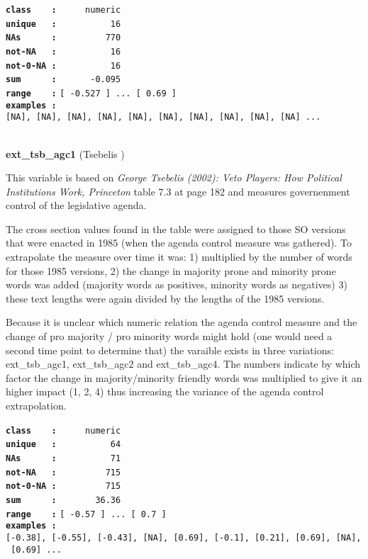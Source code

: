 \documentclass[]{article}
\begin{document}
\textbf{\texttt{class\ \ \ \ :}} \texttt{~~~~~numeric}\\
\textbf{\texttt{unique\ \ \ :}} \texttt{~~~~~~~~~~16}\\
\textbf{\texttt{NAs\ \ \ \ \ \ :}} \texttt{~~~~~~~~~770}\\
\textbf{\texttt{not-NA\ \ \ :}} \texttt{~~~~~~~~~~16}\\
\textbf{\texttt{not-0-NA\ :}} \texttt{~~~~~~~~~~16}\\
\textbf{\texttt{sum\ \ \ \ \ \ :}} \texttt{~~~~~~-0.095}\\
\textbf{\texttt{range\ \ \ \ :}}
\texttt{{[}\ -0.527\ {]}\ ...\ {[}\ 0.69\ {]}}\\
\textbf{\texttt{examples\ :}}
\texttt{{[}NA{]},\ {[}NA{]},\ {[}NA{]},\ {[}NA{]},\ {[}NA{]},\ {[}NA{]},\ {[}NA{]},\ {[}NA{]},\ {[}NA{]},\ {[}NA{]}\ ...}\\

~

\textbf{ext\_tsb\_agc1} (Tsebelis )

This variable is based on \emph{George Tsebelis (2002): Veto Players:
How Political Institutions Work, Princeton} table 7.3 at page 182 and
measures governenment control of the legislative agenda.

The cross section values found in the table were assigned to those SO
versions that were enacted in 1985 (when the agenda control measure was
gathered). To extrapolate the measure over time it was: 1) multiplied by
the number of words for those 1985 versions, 2) the change in majority
prone and minority prone words was added (majority words as positives,
minority words as negatives) 3) these text lengths were again divided by
the lengths of the 1985 versions.

Because it is unclear which numeric relation the agenda control measure
and the change of pro majority / pro minority words might hold (one
would need a second time point to determine that) the varaible exists in
three variations: ext\_tsb\_agc1, ext\_tsb\_agc2 and ext\_tsb\_agc4. The
numbers indicate by which factor the change in majority/minority
friendly words was multiplied to give it an higher impact (1, 2, 4) thus
increasing the variance of the agenda control extrapolation.

\textbf{\texttt{class\ \ \ \ :}} \texttt{~~~~~numeric}\\
\textbf{\texttt{unique\ \ \ :}} \texttt{~~~~~~~~~~64}\\
\textbf{\texttt{NAs\ \ \ \ \ \ :}} \texttt{~~~~~~~~~~71}\\
\textbf{\texttt{not-NA\ \ \ :}} \texttt{~~~~~~~~~715}\\
\textbf{\texttt{not-0-NA\ :}} \texttt{~~~~~~~~~715}\\
\textbf{\texttt{sum\ \ \ \ \ \ :}} \texttt{~~~~~~~36.36}\\
\textbf{\texttt{range\ \ \ \ :}}
\texttt{{[}\ -0.57\ {]}\ ...\ {[}\ 0.7\ {]}}\\
\textbf{\texttt{examples\ :}}
\texttt{{[}-0.38{]},\ {[}-0.55{]},\ {[}-0.43{]},\ {[}NA{]},\ {[}0.69{]},\ {[}-0.1{]},\ {[}0.21{]},\ {[}0.69{]},\ {[}NA{]},\ {[}0.69{]}\ ...}\\
\end{document}
